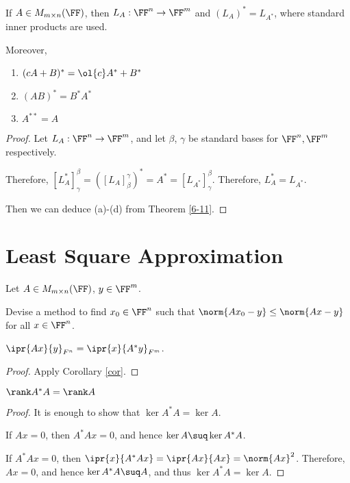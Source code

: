 \documentclass[11pt]{scrartcl}
\begin{document}
\begin{corollary}
  \label{cor}
  If $A\in M_{m\times n}(\FF)$, then $L_A:\FF^n\to \FF^m$ and
  $(L_A)^{*} = L_{A^{*}}$, where standard inner products are used.

  Moreover,

  \begin{enumerate}[label=\alph*)]
  \item $(cA+B)^{*} = \ol{c}A^{*}+B^{*}$
  \item $(AB)^{*} = B^{*}A^{*}$
  \item $A^{**} = A$
  \end{enumerate}
\end{corollary}
\begin{proof}

  Let $L_A: \FF^n\to \FF^m$, and let $\beta$, $\gamma$ be standard
  bases for $\FF^n, \FF^m$ respectively.

  Therefore,
  $[L_A^{*}]_{\gamma}^{\beta} = ([L_A]_{\beta}^{\gamma})^{*} = A^{*} =
  [L_{A^{*}}]_{\gamma}^{\beta}$. Therefore, $L_A^{*} = L_{A^{*}}$.

  Then we can deduce (a)-(d) from Theorem \ref{6-11}.
  
\end{proof}

\section{Least Square Approximation}

Let $A\in M_{m\times n}(\FF)$, $y\in\FF^m$.

\begin{problem*}
  Devise a method to find $x_0\in\FF^n$ such that
  $\norm{Ax_0-y}\leq\norm{Ax-y}$ for all $x\in\FF^{n}$.
\end{problem*}

\begin{lemma}
  \label{l-1}
  $\ipr{Ax}{y}_{F^n} = \ipr{x}{A^{*}y}_{F^m}$.
\end{lemma}
\begin{proof}
Apply Corollary \ref{cor}.
\end{proof}

\begin{lemma}
  \label{l-2}
$\rank A^{*}A = \rank A$
\end{lemma}

\begin{proof}
  It is enough to show that $\ker A^{*}A = \ker A$.

  If $Ax = 0$, then $A^{*}Ax = 0$, and hence $\ker A \suq \ker A^{*}A$.

  If $A^{*}Ax = 0$, then
  $\ipr{x}{A^{*}Ax} = \ipr{Ax}{Ax} = \norm{Ax}^2$. Therefore,
  $Ax = 0$, and hence $\ker A^{*}A \suq A$, and thus $\ker A^{*}A = \ker A$.
\end{proof}
\end{document}
